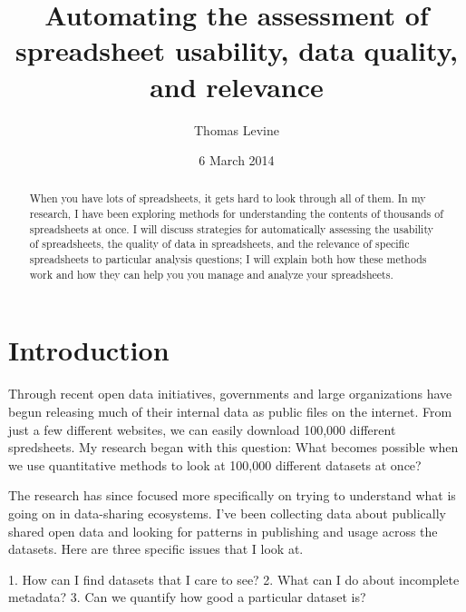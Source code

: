 \documentclass{acm_proc_article-sp}
\begin{document}
\title{Automating the assessment of spreadsheet usability, data quality, and relevance}
\author{ \alignauthor Thomas Levine\\  }
\date{6 March 2014}
\maketitle
\begin{abstract}
When you have lots of spreadsheets, it gets hard to look through all of them.
In my research, I have been exploring methods for understanding the contents
of thousands of spreadsheets at once. I will discuss strategies for automatically
assessing the usability of spreadsheets, the quality of data
in spreadsheets, and the relevance of specific spreadsheets to particular
analysis questions; I will explain both how these methods work and how they
can help you you manage and analyze your spreadsheets.
\end{abstract}


\section{Introduction}
Through recent open data initiatives, governments and large organizations have
begun releasing much of their internal data as public files on the internet.
From just a few different websites, we can easily download 100,000 different
spredsheets.\cite{ny-talk}
My research began with this question: What becomes possible when we use
quantitative methods to look at 100,000 different datasets at once?

The research has since focused more specifically on trying to understand what
is going on in data-sharing ecosystems.
I've been collecting data about publically shared open data
and looking for patterns in publishing and usage across the datasets.
Here are three specific issues that I look at.

1. How can I find datasets that I care to see?
2. What can I do about incomplete metadata?
3. Can we quantify how good a particular dataset is?
\end{document}
